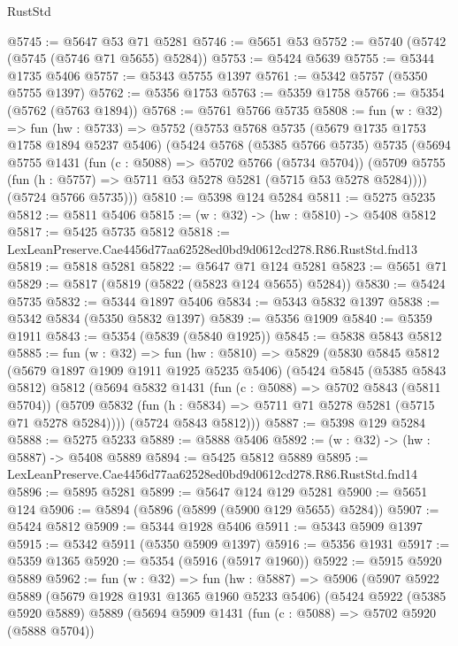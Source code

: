 \begin{lexlean}{RustStd}
\begin{coremodule}
@5745 := @5647 @53 @71 @5281
@5746 := @5651 @53
@5752 := @5740 (@5742 (@5745 (@5746 @71 @5655) @5284))
@5753 := @5424 @5639
@5755 := @5344 @1735 @5406
@5757 := @5343 @5755 @1397
@5761 := @5342 @5757 (@5350 @5755 @1397)
@5762 := @5356 @1753
@5763 := @5359 @1758
@5766 := @5354 (@5762 (@5763 @1894))
@5768 := @5761 @5766 @5735
@5808 := fun (w : @32) =>
  fun (hw : @5733) =>
  @5752
    (@5753
      @5768
      @5735
      (@5679 @1735 @1753 @1758 @1894 @5237 @5406)
      (@5424
        @5768
        (@5385 @5766 @5735)
        @5735
        (@5694
          @5755
          @1431
          (fun (c : @5088) => @5702 @5766 (@5734 @5704))
          (@5709 @5755 (fun (h : @5757) => @5711 @53 @5278 @5281 (@5715 @53 @5278 @5284))))
        (@5724 @5766 @5735)))
@5810 := @5398 @124 @5284
@5811 := @5275 @5235
@5812 := @5811 @5406
@5815 := (w : @32) -> (hw : @5810) -> @5408 @5812
@5817 := @5425 @5735 @5812
@5818 := LexLeanPreserve.Cae4456d77aa62528ed0bd9d0612cd278.R86.RustStd.fnd13
@5819 := @5818 @5281
@5822 := @5647 @71 @124 @5281
@5823 := @5651 @71
@5829 := @5817 (@5819 (@5822 (@5823 @124 @5655) @5284))
@5830 := @5424 @5735
@5832 := @5344 @1897 @5406
@5834 := @5343 @5832 @1397
@5838 := @5342 @5834 (@5350 @5832 @1397)
@5839 := @5356 @1909
@5840 := @5359 @1911
@5843 := @5354 (@5839 (@5840 @1925))
@5845 := @5838 @5843 @5812
@5885 := fun (w : @32) =>
  fun (hw : @5810) =>
  @5829
    (@5830
      @5845
      @5812
      (@5679 @1897 @1909 @1911 @1925 @5235 @5406)
      (@5424
        @5845
        (@5385 @5843 @5812)
        @5812
        (@5694
          @5832
          @1431
          (fun (c : @5088) => @5702 @5843 (@5811 @5704))
          (@5709 @5832 (fun (h : @5834) => @5711 @71 @5278 @5281 (@5715 @71 @5278 @5284))))
        (@5724 @5843 @5812)))
@5887 := @5398 @129 @5284
@5888 := @5275 @5233
@5889 := @5888 @5406
@5892 := (w : @32) -> (hw : @5887) -> @5408 @5889
@5894 := @5425 @5812 @5889
@5895 := LexLeanPreserve.Cae4456d77aa62528ed0bd9d0612cd278.R86.RustStd.fnd14
@5896 := @5895 @5281
@5899 := @5647 @124 @129 @5281
@5900 := @5651 @124
@5906 := @5894 (@5896 (@5899 (@5900 @129 @5655) @5284))
@5907 := @5424 @5812
@5909 := @5344 @1928 @5406
@5911 := @5343 @5909 @1397
@5915 := @5342 @5911 (@5350 @5909 @1397)
@5916 := @5356 @1931
@5917 := @5359 @1365
@5920 := @5354 (@5916 (@5917 @1960))
@5922 := @5915 @5920 @5889
@5962 := fun (w : @32) =>
  fun (hw : @5887) =>
  @5906
    (@5907
      @5922
      @5889
      (@5679 @1928 @1931 @1365 @1960 @5233 @5406)
      (@5424
        @5922
        (@5385 @5920 @5889)
        @5889
        (@5694
          @5909
          @1431
          (fun (c : @5088) => @5702 @5920 (@5888 @5704))

\end{coremodule}
\end{lexlean}
